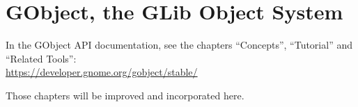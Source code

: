 \chapter{GObject, the GLib Object System}

In the GObject API documentation, see the chapters ``Concepts'', ``Tutorial'' and ``Related Tools'':\\
\url{https://developer.gnome.org/gobject/stable/}

Those chapters will be improved and incorporated here.
